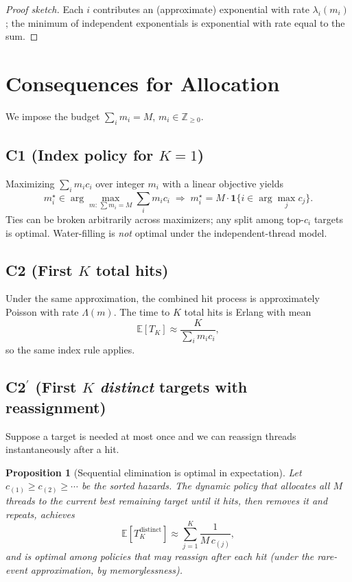 \documentclass[11pt]{article}
\newtheorem{proposition}{Proposition}
\newcommand{\E}{\mathbb{E}}
\newcommand{\1}{\mathbf{1}}
\begin{document}
\begin{proof}[Proof sketch]
Each $i$ contributes an (approximate) exponential with rate $\lambda_i(m_i)$; the minimum of independent exponentials is exponential with rate equal to the sum\cite{Durrett2019,Ross2014}.
\end{proof}

\section{Consequences for Allocation}
We impose the budget $\sum_i m_i=M$, $m_i\in\mathbb{Z}_{\ge 0}$.

\subsection*{C1 (Index policy for $K{=}1$)}
Maximizing $\sum_i m_i c_i$ over integer $m_i$ with a linear objective yields
\begin{equation}
m_i^\star \in \arg\max_{m:\,\sum m_i=M} \sum_i m_i c_i
\;\Rightarrow\;
m_i^\star=M\cdot \1\{i\in\arg\max_j c_j\}.
\end{equation}
Ties can be broken arbitrarily across maximizers; any split among top-$c_i$ targets is optimal. Water-filling is \emph{not} optimal under the independent-thread model.

\subsection*{C2 (First $K$ total hits)}
Under the same approximation, the combined hit process is approximately Poisson with rate $\Lambda(m)$. The time to $K$ total hits is Erlang with mean
\begin{equation}
\E[T_{K}] \approx \frac{K}{\sum_i m_i c_i},
\end{equation}
so the same index rule applies\cite{Ross2014}.

\subsection*{C2$^\prime$ (First $K$ \emph{distinct} targets with reassignment)}
Suppose a target is needed at most once and we can reassign threads instantaneously after a hit.
\begin{proposition}[Sequential elimination is optimal in expectation]
\label{prop:seq}
Let $c_{(1)}\ge c_{(2)}\ge \cdots$ be the sorted hazards. The dynamic policy that allocates all $M$ threads to the current best remaining target until it hits, then removes it and repeats, achieves
\begin{equation}
\E[T_{K}^{\text{distinct}}] \approx \sum_{j=1}^K \frac{1}{M\,c_{(j)}},
\end{equation}
and is optimal among policies that may reassign after each hit (under the rare-event approximation, by memorylessness\cite{Ross2014}).
\end{proposition}
\end{document}
